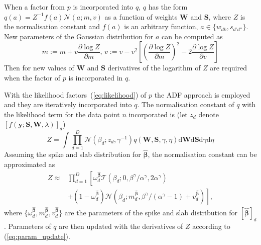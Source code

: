 \documentclass{article}
\begin{document}
  When a factor from $p$ is incorporated into $q$, $q$ has the form $q(a) = Z^{-1}f(a)\mathcal{N}(a; m, v)$ as a function of weights $\mathbf{W}$ and $\mathbf{S}$,
  where $Z$ is the normalisation constant and $f(a)$ is an arbitrary function, $a \in \{w_{dk}, s_{d'd''}\}$. New parameters of the Gaussian distribution for $a$ can be computed as~\cite{minka2001thesis}
  \begin{equation}
  \label{eq:param_update}
  m:= m + v \frac{\partial \log Z}{\partial m}, \,
  v:= v - v^2\left[ \left(\frac{\partial \log Z}{\partial m}\right)^2 - 2 \frac{\partial \log Z}{\partial v}\right]
  \end{equation}
Then for new values of $\mathbf{W}$ and $\mathbf{S}$ derivatives of the logarithm of $Z$ are required when the factor of $p$ is incorporated in $q$.

  With the likelihood factors~(\ref{eq:likelihood}) of $p$ the ADF approach is employed and they are iteratively incorporated into $q$. The normalisation constant of $q$ with the likelihood term for the data point $n$ incorporated is (let $z_d$ denote  $[f(\mathbf{y} ; \mathbf{S}, \mathbf{W}, \lambda)]_d$) %
  \begin{equation}
  Z  = \int \prod_{d=1}^{D} \mathcal{N}(\beta_d ; z_d, \gamma^{-1}) q(\mathbf{W}, \mathbf{S}, \gamma, \eta) \mathrm{d}\mathbf{W} \mathrm{d}\mathbf{S} \mathrm{d}\gamma \mathrm{d}\eta
  \end{equation}
  Assuming the spike and slab distribution for $\widehat{\boldsymbol\beta}$, the normalisation constant can be approximated as
  \begin{equation}
  \label{eq:Z}
  \begin{split}
  Z \approx & \prod_{d=1}^D \left[\omega^{\widehat{\boldsymbol\beta}}_d  \mathcal{T}\left(\beta_d ; 0, \beta^\gamma / \alpha^\gamma, 2\alpha^\gamma\right) \right.\\
  &\left. + (1 - \omega^{\widehat{\boldsymbol\beta}}_d)\mathcal{N}(\beta_d ; m^{\widehat{\boldsymbol\beta}}_d,  \beta^\gamma / (\alpha^\gamma - 1) + v^{\widehat{\boldsymbol\beta}}_d)\right],
  \end{split}
  \end{equation}
  where $\{\omega^{\widehat{\boldsymbol\beta}}_d, m^{\widehat{\boldsymbol\beta}}_d, v^{\widehat{\boldsymbol\beta}}_d\}$ are the parameters of the spike and slab distribution for $[\widehat{\boldsymbol\beta}]_d$. Parameters of $q$ are then updated with the derivatives of $Z$ according to (\ref{eq:param_update}).
\end{document}
